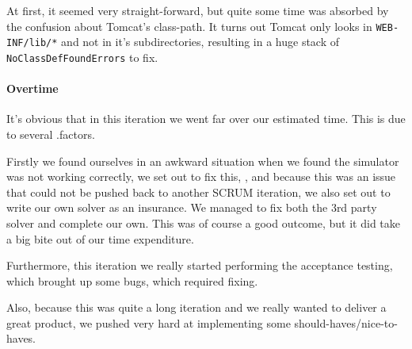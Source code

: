 \documentclass[a4paper]{article}
\begin{document}
At first, it seemed very straight-forward, but quite some time was absorbed by the confusion about Tomcat's class-path. It turns out Tomcat only looks in \verb|WEB-INF/lib/*| and not in it's subdirectories, resulting in a huge stack of \verb|NoClassDefFoundErrors| to fix.

\paragraph{Overtime}
It's obvious that in this iteration we went far over our estimated time. This is due to several .factors.

Firstly we found ourselves in an awkward situation when we found the simulator was not working correctly, we set out to fix this, , and because this was an issue that could not be pushed back to another SCRUM iteration, we also set out to write our own solver as an insurance.
We managed to fix both the 3rd party solver and complete our own. This was of course a good outcome, but it did take a big bite out of our time expenditure.

Furthermore, this iteration we really started performing the acceptance testing, which brought up some bugs, which required fixing.

Also, because this was quite a long iteration and we really wanted to deliver a great product, we pushed very hard at implementing some should-haves/nice-to-haves.
\end{document}

